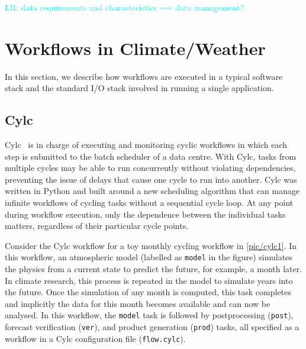 \documentclass{superfri}
\newcommand{\lr}[1]{\textcolor{cyan}{LR: #1}}
\begin{document}
\lr{data requirements and characteristics == data management?}

\section{Workflows in Climate/Weather}
\label{sec:workflows}

In this section, we describe how workflows are executed in a typical software stack and the standard I/O stack involved in running a single application.

\subsection{Cylc}

Cylc~\cite{8675433} is in charge of executing and monitoring cyclic workflows in which each step is submitted to the batch scheduler of a data centre.
With Cylc, tasks from multiple cycles may be able to run concurrently without violating dependencies, preventing the issue of delays that cause one cycle to run into another.
Cylc was written in Python and built around a new scheduling algorithm that can manage infinite workflows of cycling tasks without a sequential cycle loop.
At any point during workflow execution, only the dependence between the individual tasks matters, regardless of their particular cycle points.

Consider the Cylc workflow for a toy monthly cycling workflow in \cref{pic/cylc1}.
In this workflow, an atmospheric model (labelled as \texttt{model} in the figure) simulates the physics from a current state to predict the future, for example, a month later.
In climate research, this process is repeated in the model to simulate years into the future.
Once the simulation of any month is computed, this task completes and implicitly the data for this month becomes available and can now be analysed.
In this workflow, the \texttt{model} task is followed by postprocessing (\texttt{post}), forecast verification (\texttt{ver}), and product generation (\texttt{prod}) tasks, all specified as a workflow in a Cylc configuration file (\texttt{flow.cylc}).

\end{document}
